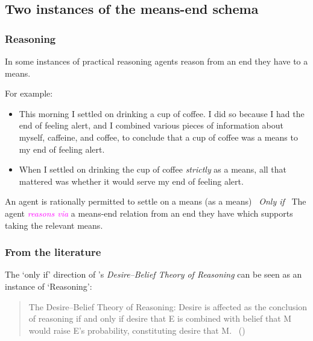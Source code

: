 \documentclass[10pt]{article}
\newenvironment{beamerblock}[1]{%
  \tcolorbox[standard,%
  no shadow,
  noparskip,
  colback=white,
  colframe=black,
  colbacktitle=white,
  coltitle=black,
  colupper=black,
  size=small,
  boxrule=.125mm,
  fonttitle=\bfseries,
  sharp corners=all,
  title=#1]}%
{\endtcolorbox}
\newcommand{\hozlinedash}[0]{%
  \noindent\hdashrule[0.5ex][c]{\textwidth}{.1pt}{2.5pt}
}
\begin{document}
\hozlinedash


\subsection{Two instances of the means-end schema}
\label{sec:two-instances-means}

\subsubsection{Reasoning}
\label{sec:reasoning}

In some instances of practical reasoning agents reason from an end they have to a means.

For example:
\begin{itemize}
\item This morning I settled on drinking a cup of coffee. I did so because I had the end of feeling alert, and I combined various pieces of information about myself, caffeine, and coffee, to conclude that a cup of coffee was a means to my end of feeling alert.
\item When I settled on drinking the cup of coffee \emph{strictly} as a means, all that mattered was whether it would serve my end of feeling alert.
\end{itemize}

\begin{beamerblock}{Reasoning}
  An agent is rationally permitted to settle on a means (as a means)
  \newline
  \mbox{ }\hfill\emph{Only if}\hfill\mbox{ }
  \newline
  The agent \textcolor{fuchsia}{\emph{reasons via}} a means-end relation from an end they have which supports taking the relevant means.
\end{beamerblock}

\subsubsection{From the literature}
\label{sec:from-literature}



The `only if' direction of \citeauthor{Sinhababu:2017aa}'s \emph{Desire–Belief Theory of Reasoning} can be seen as an instance of `Reasoning':

\begin{quote}
  The Desire–Belief Theory of Reasoning: Desire is affected as the conclusion of reasoning if and only if desire that E is combined with belief that M would raise E’s probability, constituting desire that M.\nolinebreak
  \mbox{ }\hfill\mbox{(\citeyear[39]{Sinhababu:2017aa})}
\end{quote}
\end{document}
